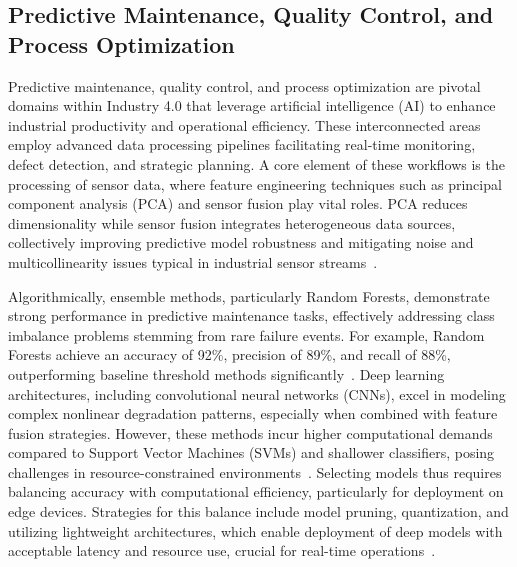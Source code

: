 \documentclass[sigconf]{acmart}
\begin{document}
\subsection{Predictive Maintenance, Quality Control, and Process Optimization}

Predictive maintenance, quality control, and process optimization are pivotal domains within Industry 4.0 that leverage artificial intelligence (AI) to enhance industrial productivity and operational efficiency. These interconnected areas employ advanced data processing pipelines facilitating real-time monitoring, defect detection, and strategic planning. A core element of these workflows is the processing of sensor data, where feature engineering techniques such as principal component analysis (PCA) and sensor fusion play vital roles. PCA reduces dimensionality while sensor fusion integrates heterogeneous data sources, collectively improving predictive model robustness and mitigating noise and multicollinearity issues typical in industrial sensor streams~\cite{ref30,ref33}.

Algorithmically, ensemble methods, particularly Random Forests, demonstrate strong performance in predictive maintenance tasks, effectively addressing class imbalance problems stemming from rare failure events. For example, Random Forests achieve an accuracy of 92\%, precision of 89\%, and recall of 88\%, outperforming baseline threshold methods significantly~\cite{ref29,ref24}. Deep learning architectures, including convolutional neural networks (CNNs), excel in modeling complex nonlinear degradation patterns, especially when combined with feature fusion strategies. However, these methods incur higher computational demands compared to Support Vector Machines (SVMs) and shallower classifiers, posing challenges in resource-constrained environments~\cite{ref24,ref32}. Selecting models thus requires balancing accuracy with computational efficiency, particularly for deployment on edge devices. Strategies for this balance include model pruning, quantization, and utilizing lightweight architectures, which enable deployment of deep models with acceptable latency and resource use, crucial for real-time operations~\cite{ref30,ref32}.
\end{document}

